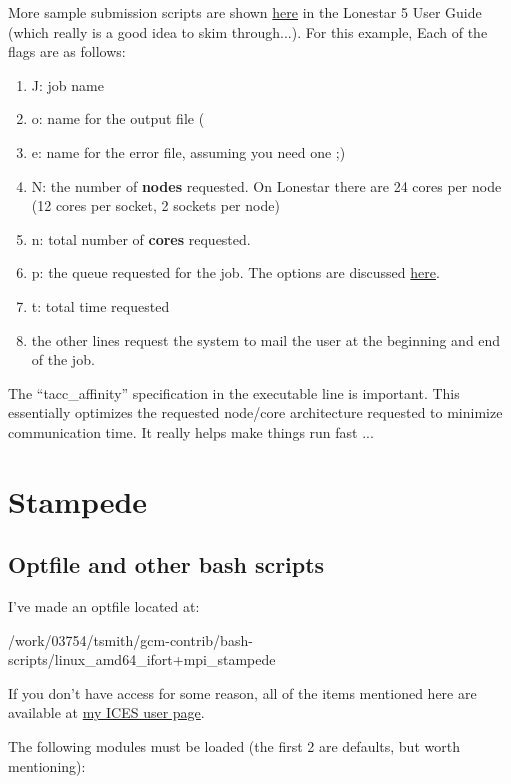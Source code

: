 \documentclass[a4paper,11pt]{article}
\begin{document}
	More sample submission scripts are shown \href{https://portal.tacc.utexas.edu/user-guides/lonestar5#submit-a-batch-job-with-sbatch}{here} in the Lonestar 5 User Guide (which really is a good idea to skim through...). For this example, Each of the flags are as follows: 
	\begin{enumerate}
	  \item J: job name
	  \item o: name for the output file (%
	  \item e: name for the error file, assuming you need one ;) 
	  \item N: the number of \textbf{nodes} requested. On Lonestar there are 24 cores per node (12 cores per socket, 2 sockets per node) 
	  \item n: total number of \textbf{cores} requested.
	  \item p: the queue requested for the job. The options are discussed \href{https://portal.tacc.utexas.edu/user-guides/lonestar5#production-queues}{here}.
	  \item t: total time requested 
	  \item the other lines request the system to mail the user at the beginning and end of the job.
	\end{enumerate}

	The ``tacc\_affinity'' specification in the executable line is important. This essentially optimizes the requested node/core architecture requested to minimize communication time. It really helps make things run fast ...



\section{Stampede}

	\subsection{Optfile and other bash scripts}
	
	I've made an optfile located at: 
	
	/work/03754/tsmith/gcm-contrib/bash-scripts/linux\_amd64\_ifort+mpi\_stampede

	If you don't have access for some reason, all of the items mentioned here are available at \href{http://users.ices.utexas.edu/~tsmith/bash-scripts/}{my ICES user page}.

	The following modules must be loaded (the first 2 are defaults, but worth mentioning): 
\end{document}
